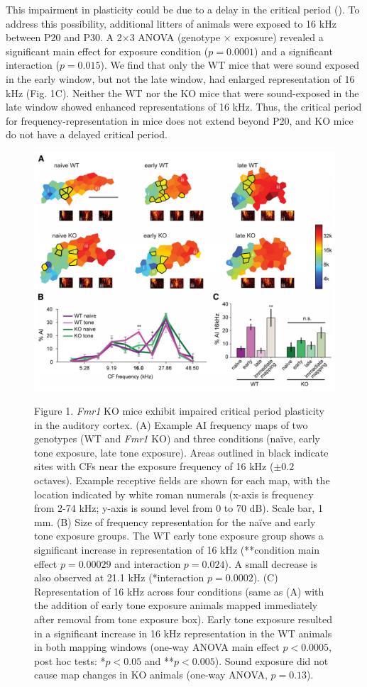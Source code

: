 This impairment in plasticity could be due to a delay in the critical period (\cite{Harlow2010a}). To address this possibility, additional litters of animals were exposed to 16 kHz between P20 and P30. A 2$\times$3 ANOVA (genotype $\times$ exposure) revealed a significant main effect for exposure condition ($p=0.0001$) and a significant interaction ($p=0.015$). We find that only the WT mice that were sound exposed in the early window, but not the late window, had enlarged representation of 16 kHz (Fig. 1C). Neither the WT nor the KO mice that were sound-exposed in the late window showed enhanced representations of 16 kHz. Thus, the critical period for frequency-representation in mice does not extend beyond P20, and KO mice do not have a delayed critical period.

\begin{figure}[p]
	\centering
		\includegraphics[width=6in]{images/C2F1}
	\begin{changemargin}{1in}{1in}
	\footnotesize{Figure 1. \textit{Fmr1} KO mice exhibit impaired critical period plasticity in the auditory cortex. (A) Example AI frequency maps of two genotypes (WT and \textit{Fmr1} KO) and three conditions (na\"ive, early tone exposure, late tone exposure). Areas outlined in black indicate sites with CFs near the exposure frequency of 16 kHz ($\pm0.2$ octaves). Example receptive fields are shown for each map, with the location indicated by white roman numerals (x-axis is frequency from 2-74 kHz; y-axis is sound level from 0 to 70 dB). Scale bar, 1 mm. (B) Size of frequency representation for the na\"ive and early tone exposure groups. The WT early tone exposure group shows a significant increase in representation of 16 kHz (**condition main effect $p=0.00029$ and interaction $p=0.024$). A small decrease is also observed at 21.1 kHz (*interaction $p=0.0002$). (C) Representation of 16 kHz across four conditions (same as (A) with the addition of early tone exposure animals mapped immediately after removal from tone exposure box). Early tone exposure resulted in a significant increase in 16 kHz representation in the WT animals in both mapping windows (one-way ANOVA main effect $p<0.0005$, post hoc tests: *$p<0.05$ and **$p<0.005$). Sound exposure did not cause map changes in KO animals (one-way ANOVA, $p=0.13$).}

\end{changemargin}
\end{figure}
